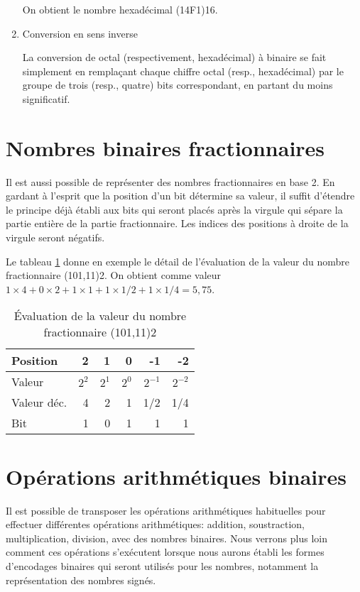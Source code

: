 \documentclass[letter, oneside]{book}
\begin{document}
\begin{enumerate}
On obtient le nombre hexadécimal (14F1)16.

\item Conversion en sens inverse
\label{sec:org16f55cb}

La conversion de octal (respectivement, hexadécimal) à binaire se fait
simplement en remplaçant chaque chiffre octal (resp., hexadécimal) par
le groupe de trois (resp., quatre) bits correspondant, en partant du
moins significatif.
\end{enumerate}

\section{Nombres binaires fractionnaires}
\label{sec:org22ea532}

Il est aussi possible de représenter des nombres fractionnaires en
base 2. En gardant à l'esprit que la position d'un bit détermine sa
valeur, il suffit d'étendre le principe déjà établi aux bits qui
seront placés après la virgule qui sépare la partie entière de la
partie fractionnaire. Les indices des positions à droite de la virgule
seront négatifs.

Le tableau \ref{tab:orgdfaa829} donne en exemple le détail de l'évaluation
de la valeur du nombre fractionnaire (101,11)2. On obtient comme
valeur \(1 \times 4 + 0 \times 2 + 1 \times 1 + 1 \times 1/2 + 1
\times 1/4 = 5,75\).

\begin{table}[htbp]
\caption{\label{tab:orgdfaa829}Évaluation de la valeur du nombre fractionnaire (101,11)2}
\centering
\begin{tabular}{lrrrrr}
Position & 2 & 1 & 0 & -1 & -2\\[0pt]
\hline
Valeur & \(2^2\) & \(2^1\) & \(2^0\) & \(2^{-1}\) & \(2^{-2}\)\\[0pt]
Valeur déc. & 4 & 2 & 1 & 1/2 & 1/4\\[0pt]
Bit & 1 & 0 & 1 & 1 & 1\\[0pt]
\end{tabular}
\end{table}

\section{Opérations arithmétiques binaires}
\label{sec:org01b4ecf}

Il est possible de transposer les opérations arithmétiques habituelles
pour effectuer différentes opérations arithmétiques: addition,
soustraction, multiplication, division, avec des nombres
binaires. Nous verrons plus loin comment ces opérations s'exécutent
lorsque nous aurons établi les formes d'encodages binaires qui seront
utilisés pour les nombres, notamment la représentation des nombres
signés.
\end{document}

